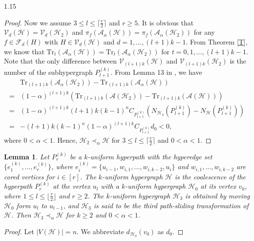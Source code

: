 \documentclass[preprint,12pt]{elsarticle1}
\newtheorem{lem}[thm]{Lemma}
\numberwithin{equation}{section}
\begin{document}
\begin{spacing}{1.15}
\begin{proof}
Now we assume $3\le l\le \lceil\frac{r}{2}\rceil$ and $r\ge5$.
It is obvious that $\mathcal{V}_{d}(\mathcal{H})=\mathcal{V}_{d}(\mathcal{H}_2)$ and $\pi_{f}(\mathcal{A}_{\alpha}(\mathcal{H}))=\pi_{f}(\mathcal{A}_{\alpha}(\mathcal{H}_2))$ for any $f\in\mathcal{F}_d(H)$ with $H\in\mathcal{V}_{d}(\mathcal{H})$ and $d=1,\ldots,(l+1)k-1$.
From Theorem \ref{T}, we know that $\mathrm{Tr}_t(\mathcal{A}_{\alpha}(\mathcal{H}))=\mathrm{Tr}_t(\mathcal{A}_{\alpha}(\mathcal{H}_2))$ for $t=0,1,\ldots,(l+1)k-1$.
Note that the only difference between $\mathcal{V}_{(l+1)k}(\mathcal{H})$ and $\mathcal{V}_{(l+1)k}(\mathcal{H}_2)$ is the number of the subhypergraph $P_{l+1}^{(k)}$.
From Lemma 13 in \cite{ref10}, we have
\begin{align*}
&\mathrm{Tr}_{(l+1)k}(\mathcal{A}_{\alpha}(\mathcal{H}_2))-\mathrm{Tr}_{(l+1)k}(\mathcal{A}_{\alpha}(\mathcal{H}))\\
=&(1-\alpha)^{(l+1)k}\left(\mathrm{Tr}_{(l+1)k}(\mathcal{A}(\mathcal{H}_2))-\mathrm{Tr}_{(l+1)k}(\mathcal{A}(\mathcal{H}))\right)\\
=&(1-\alpha)^{(l+1)k}(l+1)k(k-1)^{n}C_{P_{l+1}^{(k)}}\left( N_{\mathcal{H}_2}(P_{l+1}^{(k)})-N_{\mathcal{H}}(P_{l+1}^{(k)}) \right)\\
=&-(l+1)k(k-1)^{n}(1-\alpha)^{(l+1)k}C_{P_{l+1}^{(k)}}d_0<0,
\end{align*}
where $0<\alpha<1$.
Hence, $\mathcal{H}_2\prec_{\alpha}\mathcal{H}$ for $3\le l\le \lceil\frac{r}{2}\rceil$ and $0<\alpha<1$.
\end{proof}

\begin{lem}\label{5}
Let $P_{r}^{(k)}$ be a $k$-uniform hyperpath with the hyperedge set $\{e_1^{(k)},\ldots,e_{r}^{(k)}\}$, where $e_{i}^{(k)}=\{u_{i-1},w_{i,1},\ldots,w_{i,k-2},u_i\}$ and $w_{i,1},\ldots,w_{i,k-2}$ are cored vertices for $i\in[r]$.
The $k$-uniform hypergraph $\mathcal{H}$ is the coalescence of the hyperpath $P_{r}^{(k)}$ at the vertex $u_l$ with a $k$-uniform hypergraph $\mathcal{H}_0$ at its vertex $v_0$, where $1\le l\le \lfloor\frac{r}{2}\rfloor$ and $r\ge2$.
The $k$-uniform hypergraph $\mathcal{H}_{3}$ is obtained by moving $\mathcal{H}_0$ form $u_l$ to $u_{l-1}$, and $\mathcal{H}_3$ is said to be \textit{the third path-sliding transformation} of $\mathcal{H}$.
Then $\mathcal{H}_{3}\prec_{\alpha}\mathcal{H}$ for $k\ge2$ and $0<\alpha<1$.
\end{lem}

\begin{proof}
Let $|V(\mathcal{H})|=n$.
We abbreviate $d_{\mathcal{H}_0}(v_0)$ as $d_0$.


\end{proof}
\end{spacing}
\end{document}

